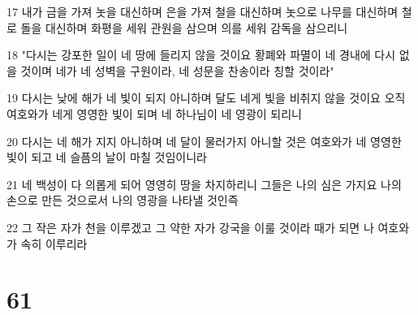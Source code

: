 \par 17 내가 금을 가져 놋을 대신하며 은을 가져 철을 대신하며 놋으로 나무를 대신하며 철로 돌을 대신하며 화평을 세워 관원을 삼으며 의를 세워 감독을 삼으리니
\par 18 "다시는 강포한 일이 네 땅에 들리지 않을 것이요 황폐와 파멸이 네 경내에 다시 없을 것이며 네가 네 성벽을 구원이라, 네 성문을 찬송이라 칭할 것이라"
\par 19 다시는 낮에 해가 네 빛이 되지 아니하며 달도 네게 빛을 비취지 않을 것이요 오직 여호와가 네게 영영한 빛이 되며 네 하나님이 네 영광이 되리니
\par 20 다시는 네 해가 지지 아니하며 네 달이 물러가지 아니할 것은 여호와가 네 영영한 빛이 되고 네 슬픔의 날이 마칠 것임이니라
\par 21 네 백성이 다 의롭게 되어 영영히 땅을 차지하리니 그들은 나의 심은 가지요 나의 손으로 만든 것으로서 나의 영광을 나타낼 것인즉
\par 22 그 작은 자가 천을 이루겠고 그 약한 자가 강국을 이룰 것이라 때가 되면 나 여호와가 속히 이루리라

\chapter{61}

